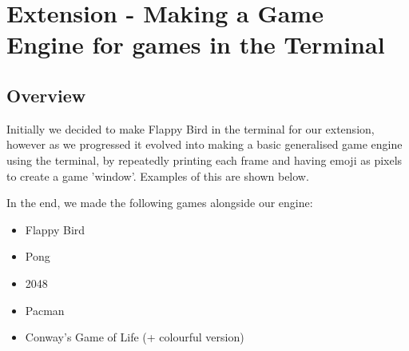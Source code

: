 \documentclass{article}
\begin{document}
\section{Extension - Making a Game Engine for games in the Terminal}

\subsection{Overview}

Initially we decided to make Flappy Bird in the terminal for our extension, however as we progressed it evolved into making a basic generalised game engine using the terminal, by repeatedly printing each frame and having emoji as pixels to create a game 'window'. Examples of this are shown below.

In the end, we made the following games alongside our engine:
\begin{itemize}
    \item Flappy Bird
    \item Pong
    \item 2048
    \item Pacman
    \item Conway's Game of Life (+ colourful version)
\end{itemize}
\end{document}
